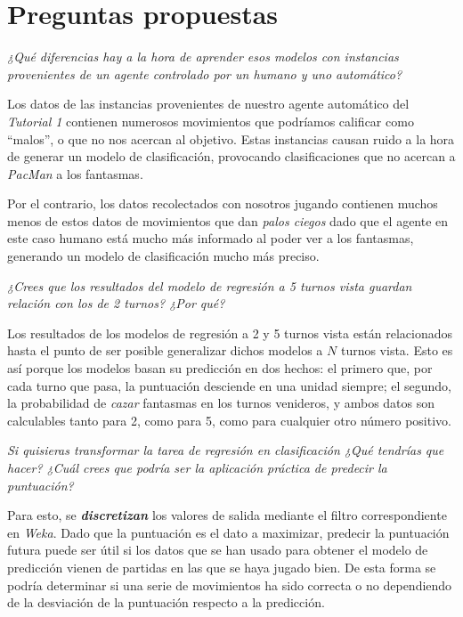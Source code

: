 \documentclass[12pt]{article}
\begin{document}
\newpage
\section{Preguntas propuestas}

\begin{center}
    \emph{¿Qué diferencias hay a la hora de aprender esos modelos con instancias provenientes de un agente controlado por un humano y uno automático?}
\end{center}

Los datos de las instancias provenientes de nuestro agente automático del \emph{Tutorial 1} contienen numerosos movimientos que podríamos calificar como ``malos'', o que no nos acercan al objetivo. Estas instancias causan ruido a la hora de generar un modelo de clasificación, provocando clasificaciones que no acercan a \emph{PacMan} a los fantasmas.

Por el contrario, los datos recolectados con nosotros jugando contienen muchos menos de estos datos de movimientos que dan \emph{palos ciegos} dado que el agente en este caso humano está mucho más informado al poder ver a los fantasmas, generando un modelo de clasificación mucho más preciso.

\begin{center}
     \emph{¿Crees que los resultados del modelo de regresión a 5 turnos vista guardan relación con los de 2 turnos? ¿Por qué?}
\end{center}

Los resultados de los modelos de regresión a 2 y 5 turnos vista están relacionados hasta el punto de ser posible generalizar dichos modelos a $N$ turnos vista. Esto es así porque los modelos basan su predicción en dos hechos: el primero que, por cada turno que pasa, la puntuación desciende en una unidad siempre; el segundo, la probabilidad de \emph{cazar} fantasmas en los turnos venideros, y ambos datos son calculables tanto para 2, como para 5, como para cualquier otro número positivo.

\begin{center}
     \emph{Si quisieras transformar la tarea de regresión en clasificación ¿Qué tendrías que hacer? ¿Cuál crees que podría ser la aplicación práctica de predecir la puntuación?}
\end{center}

Para esto, se \textbf{\emph{discretizan}} los valores de salida mediante el filtro correspondiente en \emph{Weka}. Dado que la puntuación es el dato a maximizar, predecir la puntuación futura puede ser útil si los datos que se han usado para obtener el modelo de predicción vienen de partidas en las que se haya jugado bien. De esta forma se podría determinar si una serie de movimientos ha sido correcta o no dependiendo de la desviación de la puntuación respecto a la predicción.
\end{document}
